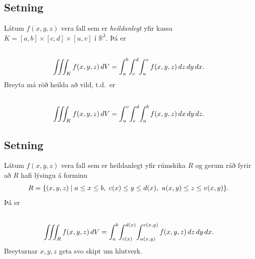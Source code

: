 \documentclass[a4paper,10pt,icelandic]{sphinxmanual}
\begin{document}
\subsection{Setning}
\label{Kafli4:id16}
Látum \(f(x,y,z)\) vera fall sem er \textit{heildanlegt} yfir kassa
\(K=[a,b]\times[c,d]\times[u,v]\) í \({\mathbb  R}^3\). Þá er
\begin{gather}
\begin{split}\displaystyle\end{split}\notag\\\begin{split}\int\!\!\!\int\!\!\!\int_K f(x,y,z)\,dV=
\int_a^b\!\int_c^d\!\int_u^v f(x,y,z)\,dz\,dy\,dx.\end{split}\notag
\end{gather}
Breyta má röð heilda að vild, t.d. er
\begin{gather}
\begin{split}\displaystyle\end{split}\notag\\\begin{split}\int\!\!\!\int\!\!\!\int_K f(x,y,z)\,dV=
\int_u^v\!\int_c^d\!\int_a^b f(x,y,z)\,dx\,dy\,dz.\end{split}\notag
\end{gather}

\subsection{Setning}
\label{Kafli4:id17}
Látum \(f(x,y,z)\) vera fall sem er heildanlegt yfir rúmskika
\(R\) og gerum ráð fyrir að \(R\) hafi lýsingu á forminu
\begin{gather}
\begin{split}\displaystyle R=\{(x,y,z)\mid a\leq x\leq b,\ c(x)\leq y\leq d(x),\ u(x,y)\leq z\leq v(x,y)\}.\end{split}\notag
\end{gather}
Þá er
\begin{gather}
\begin{split}\displaystyle\end{split}\notag\\\begin{split}\int\!\!\!\int\!\!\!\int_R f(x,y,z)\,dV=
\int_a^b\!\int_{c(x)}^{d(x)}\!\int_{u(x,y)}^{v(x,y)} f(x,y,z)\,dz\,dy\,dx.\end{split}\notag
\end{gather}
Breyturnar \(x, y, z\) geta svo skipt um hlutverk.
\end{document}
